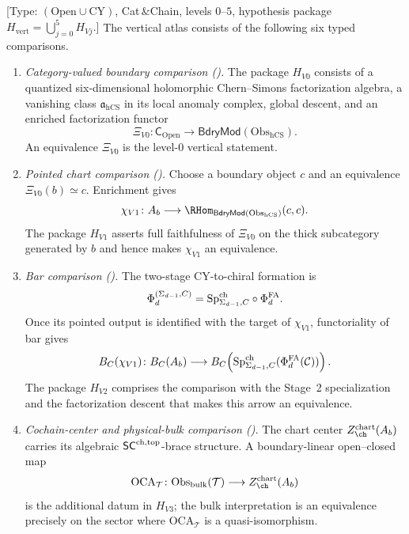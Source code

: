 \begin{theorem}
\label{thm:mr-vertical-dictionary}
\textup{[Type: $(\mathrm{Open}\cup\mathrm{CY})$, Cat$\,\&$Chain,
levels $0\text{--}5$, hypothesis package
$H_{\mathrm{vert}}=\bigcup_{j=0}^5H_{Vj}$.]}
The vertical atlas consists of the following six typed comparisons.
\begin{enumerate}[label=\textup{(V\arabic*)}]
\item \emph{Category-valued boundary comparison
(\ClaimStatusConjectured).}
The package $H_{V0}$ consists of a quantized six-dimensional
holomorphic Chern--Simons factorization algebra, a vanishing class
$\mathfrak a_{\mathrm{hCS}}$ in its local anomaly complex, global
descent, and an enriched factorization functor
\[
 \Xi_{V0}\colon\mathsf C_{\mathrm{Open}}\longrightarrow
 \mathsf{BdryMod}(\mathrm{Obs}_{\mathrm{hCS}}).
\]
An equivalence $\Xi_{V0}$ is the level-$0$ vertical statement.

\item \emph{Pointed chart comparison
(\ClaimStatusConjectured).}
Choose a boundary object $c$ and an equivalence
$\Xi_{V0}(b)\simeq c$.  Enrichment gives
\[
 \chi_{V1}\colon
 A_b\longrightarrow
 \RHom_{\mathsf{BdryMod}(\mathrm{Obs}_{\mathrm{hCS}})}(c,c).
\]
The package $H_{V1}$ asserts full faithfulness of $\Xi_{V0}$ on the
thick subcategory generated by $b$ and hence makes $\chi_{V1}$ an
equivalence.

\item \emph{Bar comparison (\ClaimStatusConditional).}
The two-stage CY-to-chiral formation is
\[
 \Phi_d^{(\Sigma_{d-1},C)}
 =\mathrm{Sp}^{\mathrm{ch}}_{\Sigma_{d-1},C}\circ\Phi^{\mathrm{FA}}_d.
\]
Once its pointed output is identified with the target of $\chi_{V1}$,
functoriality of bar gives
\[
 B_C(\chi_{V1})\colon B_C(A_b)\longrightarrow
 B_C\!\left(\mathrm{Sp}^{\mathrm{ch}}_{\Sigma_{d-1},C}
 (\Phi^{\mathrm{FA}}_d(\mathcal C))\right).
\]
The package $H_{V2}$ comprises the comparison with the Stage~2
specialization and the factorization descent that makes this arrow an
equivalence.

\item \emph{Cochain-center and physical-bulk comparison
(\ClaimStatusConditional).}
The chart center $Z_{\ch}^{\mathrm{chart}}(A_b)$ carries its algebraic
$\mathsf{SC}^{\mathrm{ch,top}}$-brace structure.  A boundary-linear open--closed map
\[
 \mathrm{OCA}_{\mathcal T}\colon
 \mathrm{Obs}_{\mathrm{bulk}}(\mathcal T)\longrightarrow
 Z_{\ch}^{\mathrm{chart}}(A_b)
\]
is the additional datum in $H_{V3}$; the bulk interpretation is an
equivalence precisely on the sector where
$\mathrm{OCA}_{\mathcal T}$ is a quasi-isomorphism.


\end{enumerate}
\end{theorem}
